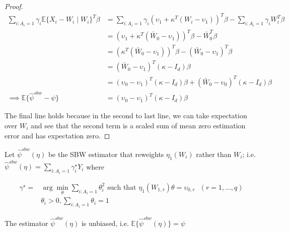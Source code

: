 \begin{proof}
\begin{align*}
    \sum_{i: A_i = 1} \gamma_i\mathbb{E}\{X_i - W_i \mid W_i\}^T\beta &= \sum_{i: A_i = 1} \gamma_i (\upsilon_1 + \kappa^T(W_i - \upsilon_1))^T\beta - \sum_{i: A_i = 1}\gamma_i W_i^T\beta \\
    &= (\upsilon_1 + \kappa^T(\bar{W}_0 - \upsilon_1))^T\beta - \bar{W}_0^T\beta \\
    &= (\kappa^T(\bar{W}_0 - \upsilon_1))^T\beta - (\bar{W}_0 - \upsilon_1)^T\beta  \\
    &= (\bar{W}_0 - \upsilon_1)^T(\kappa - I_d)\beta \\
    &= (\upsilon_0 - \upsilon_1)^T(\kappa - I_d)\beta + (\bar{W}_0 - \upsilon_0)^T(\kappa - I_d)\beta \\
    \implies \mathbb{E}\{\hat{\psi}^{sbw} - \psi\} &= (\upsilon_0 - \upsilon_1)^T(\kappa - I_d)\beta
\end{align*}

The final line holds because in the second to last line, we can take expectation over $W_i$ and see that the second term is a scaled sum of mean zero estimation error and has expectation zero. 
\end{proof}

Let $\hat{\psi}^{sbw}(\eta)$ be the SBW estimator that reweights $\eta_1(W_i)$ rather than $W_i$; i.e. $\hat{\psi}^{sbw}(\eta) = \sum_{i: A_i = 1}\gamma_i^\star Y_i$ where 

\begin{align*}
\gamma^\star = &\arg\min_{\theta} \sum_{i: A_i = 1}\theta_i^2 \text{ such that } \eta_1(W_{1, r})\theta = \upsilon_{0, r} \ \ \ (r = 1, ..., q) \\
&\theta_i > 0, \sum_{i: A_i = 1} \theta_i = 1
\end{align*}

\begin{proposition}
The estimator $\hat{\psi}^{sbw}(\eta)$ is unbiased, i.e.
$\mathbb{E}\{\hat{\psi}^{sbw}(\eta)\} = \psi$
\end{proposition}


